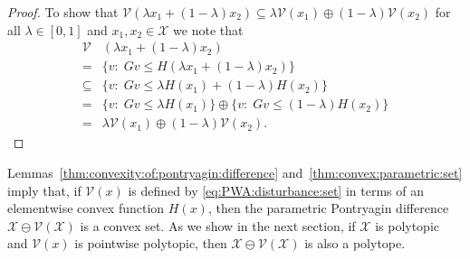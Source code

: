 \documentclass[letterpaper, 10pt, conference]{ieeeconf} %
\begin{document}
%
    \begin{proof}
      To show that $\mathcal V(\lambda x_1 + (1-\lambda)x_2)\subseteq 
      \lambda\mathcal V(x_1) \oplus(1-\lambda)\mathcal V(x_2)$ for all $\lambda \in [0,1]$ and $x_1, x_2\in\mathcal X$ we note that
        \begin{align*}
        \mathcal V&(\lambda x_1 + (1-\lambda)x_2)\\
        =& \{v:\; G v \leq H(\lambda x_1 + (1-\lambda)x_2)\}\\
        \subseteq& \{v:\;Gv\leq\lambda H(x_1)+(1-\lambda) H(x_2)\}\\
        =&\{v:\;Gv\leq\lambda H(x_1)\}\oplus\{v
        :\;Gv\leq(1-\lambda)H(x_2)\}\\
        =&\lambda\mathcal V(x_1)\oplus(1-\lambda)\mathcal V(x_2).
        \end{align*}
\baselineskip
    \end{proof} 
%
%
\def\genmat{\Xi} \def\genvec{\xi}
%
Lemmas~\ref{thm:convexity:of:pontryagin:difference} 
and~\ref{thm:convex:parametric:set} imply that, if $\mathcal V(x)$ is defined by \eqref{eq:PWA:disturbance:set} in terms of an elementwise convex function $H(x)$, then the parametric Pontryagin difference $\mathcal X\ominus \mathcal V(\mathcal X)$
is a convex set.
As we show in the next section, if $\mathcal X$ is polytopic and $\mathcal 
V(x)$ is pointwise polytopic, then $\mathcal X\ominus\mathcal V(\mathcal X)$ is 
also a polytope. 
%
%
%
%
\end{document}
